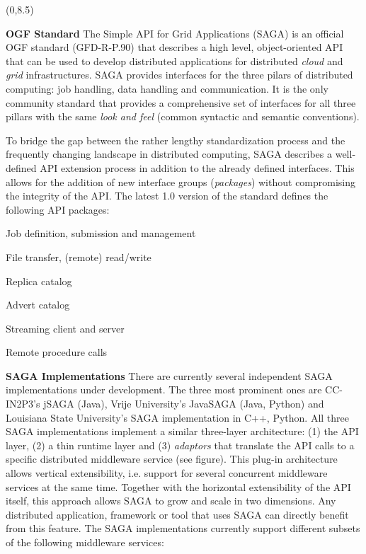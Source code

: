 \documentclass[a0b,portrait]{a0poster}
\def\LHead#1{\bigskip\bigskip\noindent{\huge\color{HeadColor} #1}\smallskip}
\begin{document}
\begin{textblock}{7}(0,8.5)

\LHead{What is SAGA?}
\large

\textbf{\color{DarkBlue} OGF Standard } The Simple API for Grid Applications
(SAGA) is an official OGF standard (GFD-R-P.90) that describes a high level,
object-oriented API that can be used to develop distributed applications for
distributed \textit{cloud} and \textit{grid} infrastructures. SAGA provides
interfaces for the three pilars of distributed computing: job handling, data
handling and communication. It is the only community standard that provides a
comprehensive set of interfaces for all three pillars with the same
\textit{look and feel} (common syntactic and semantic conventions).

To bridge the gap between the rather lengthy standardization process and the
frequently changing landscape in distributed computing, SAGA describes a
well-defined API extension process in addition to the already defined
interfaces. This allows for the addition of new interface groups
(\textit{packages}) without compromising the integrity of the API. The latest
1.0 version of the standard defines the following API packages:

\begin{list}{}{\leftmargin=1.6em}
\item{Job definition, submission and management }
\item{File transfer, (remote) read/write } 
\item{Replica catalog }
\item{Advert catalog } 
\item{Streaming client and server }
\item{Remote procedure calls } 
\end{list}

\textbf{\color{DarkBlue} SAGA Implementations } There are currently several
independent SAGA implementations under development. The three most prominent
ones are CC-IN2P3's jSAGA (Java), Vrije University's JavaSAGA (Java, Python)
and Louisiana State University's SAGA implementation in C++, Python. All three
SAGA implementations implement a similar three-layer architecture: (1) the API
layer, (2) a thin runtime layer and (3) \textit{adaptors} that translate the
API calls to a specific distributed middleware service (see figure). This
plug-in architecture allows vertical extensibility, i.e. support for several
concurrent middleware services at the same time. Together with the horizontal
extensibility of the API itself, this approach allows SAGA to grow and scale
in two dimensions. Any distributed application, framework or tool that uses
SAGA can directly benefit from this feature. The SAGA implementations
currently support different subsets of the following middleware services:


\end{textblock}
\end{document}
